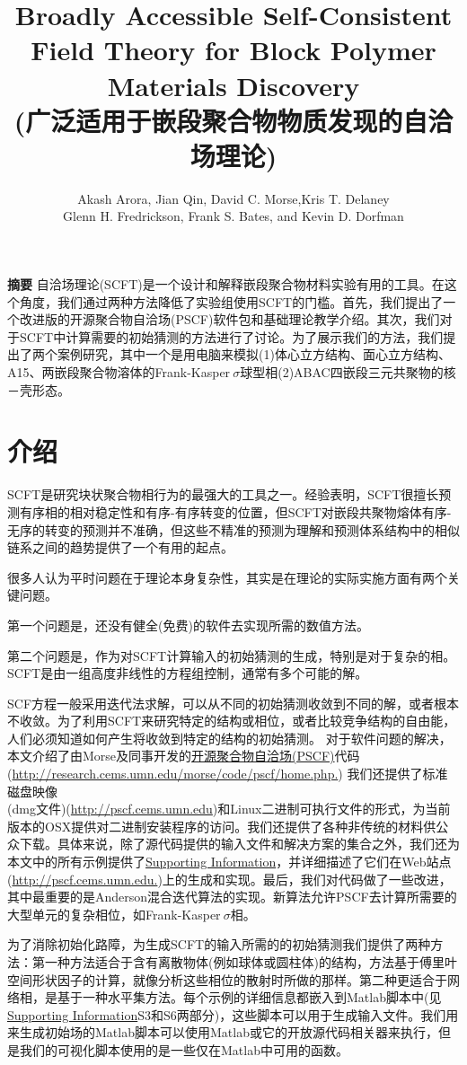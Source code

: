 \documentclass[12pt,a4paper]{article}
\title{Broadly Accessible Self-Consistent Field Theory for Block Polymer Materials Discovery\\
	(广泛适用于嵌段聚合物物质发现的自洽场理论)}
\author{Akash Arora, Jian Qin, David C. Morse,Kris T. Delaney\\Glenn H. Fredrickson, Frank S. Bates, and Kevin D. Dorfman}
\date{\chntoday}
\begin{document}
\maketitle
\newpage
\textbf{摘要}
自洽场理论(SCFT)是一个设计和解释嵌段聚合物材料实验有用的工具。在这个角度，我们通过两种方法降低了实验组使用SCFT的门槛。首先，我们提出了一个改进版的开源聚合物自洽场(PSCF)软件包和基础理论教学介绍。其次，我们对于SCFT中计算需要的初始猜测的方法进行了讨论。为了展示我们的方法，我们提出了两个案例研究，其中一个是用电脑来模拟(1)体心立方结构、面心立方结构、A15、两嵌段聚合物溶体的Frank-Kasper$~\sigma$球型相(2)ABAC四嵌段三元共聚物的核－壳形态。

\section{介绍}
SCFT是研究块状聚合物相行为的最强大的工具之一。经验表明，SCFT很擅长预测有序相的相对稳定性和有序-有序转变的位置，但SCFT对嵌段共聚物熔体有序-无序的转变的预测并不准确，但这些不精准的预测为理解和预测体系结构中的相似链系之间的趋势提供了一个有用的起点。

很多人认为平时问题在于理论本身复杂性，其实是在理论的实际实施方面有两个关键问题。

第一个问题是，还没有健全(免费)的软件去实现所需的数值方法。

第二个问题是，作为对SCFT计算输入的初始猜测的生成，特别是对于复杂的相。SCFT是由一组高度非线性的方程组控制，通常有多个可能的解。

SCF方程一般采用迭代法求解，可以从不同的初始猜测收敛到不同的解，或者根本不收敛。为了利用SCFT来研究特定的结构或相位，或者比较竞争结构的自由能，人们必须知道如何产生将收敛到特定的结构的初始猜测。
对于软件问题的解决，本文介绍了由Morse及同事开发的\underline{开源聚合物自洽场(PSCF)}代码
(\url{http://research.cems.umn.edu/morse/code/pscf/home.php.})
我们还提供了标准磁盘映像\\
(dmg文件)(\url{http://pscf.cems.umn.edu})和Linux二进制可执行文件的形式，为当前版本的OSX提供对二进制安装程序的访问。我们还提供了各种非传统的材料供公众下载。具体来说，除了源代码提供的输入文件和解决方案的集合之外，我们还为本文中的所有示例提供了\href{http://pubs.acs.org/doi/suppl/10.1021/acs.macromol.6b00107/suppl_file/ma6b00107_si_001.pdf}{Supporting Information}，并详细描述了它们在Web站点(\url{http://pscf.cems.umn.edu.})上的生成和实现。最后，我们对代码做了一些改进，其中最重要的是Anderson混合迭代算法的实现。新算法允许PSCF去计算所需要的大型单元的复杂相位，如Frank-Kasper$~\sigma$相。

为了消除初始化路障，为生成SCFT的输入所需的的初始猜测我们提供了两种方法：第一种方法适合于含有离散物体(例如球体或圆柱体)的结构，方法基于傅里叶空间形状因子的计算，就像分析这些相位的散射时所做的那样。第二种更适合于网络相，是基于一种水平集方法。每个示例的详细信息都嵌入到Matlab脚本中(见\href{http://pubs.acs.org/doi/suppl/10.1021/acs.macromol.6b00107/suppl_file/ma6b00107_si_001.pdf}{Supporting Information}S3和S6两部分)，这些脚本可以用于生成输入文件。我们用来生成初始场的Matlab脚本可以使用Matlab或它的开放源代码相关器来执行，但是我们的可视化脚本使用的是一些仅在Matlab中可用的函数。
\end{document}

